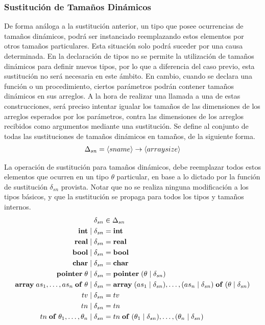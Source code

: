 \subsubsection{Sustitución de Tamaños Dinámicos}

De forma análoga a la sustitución anterior, un tipo que posee ocurrencias de tamaños dinámicos, podrá ser instanciado reemplazando estos elementos por otros tamaños particulares.
Esta situación solo podrá suceder por una causa determinada.
En la declaración de tipos no se permite la utilización de tamaños dinámicos para definir nuevos tipos, por lo que a diferencia del caso previo, esta sustitución no será necesaria en este ámbito.
En cambio, cuando se declara una función o un procedimiento, ciertos parámetros podrán contener tamaños dinámicos en sus arreglos.
A la hora de realizar una llamada a una de estas construcciones, será preciso intentar igualar los tamaños de las dimensiones de los arreglos esperados por los parámetros, contra las dimensiones de los arreglos recibidos como argumentos mediante una sustitución.
Se define al conjunto de todas las sustituciones de tamaños dinámicos en tamaños, de la siguiente forma.
\begin{gather*}
\Delta_{sn} = \langle sname \rangle \rightarrow \langle arraysize \rangle
\end{gather*}

La operación de sustitución para tamaños dinámicos, debe reemplazar todos estos elementos que ocurren en un tipo $\theta$ particular, en base a lo dictado por la función de sustitución $\delta_{sn}$ provista.
Notar que no se realiza ninguna modificación a los tipos básicos, y que la sustitución se propaga para todos los tipos y tamaños internos.
\begin{align*}
\delta_{sn}
&\in
\Delta_{sn}
\\
\mathbf{int} \mid \delta_{sn}
&=
\mathbf{int}
\\
\mathbf{real} \mid \delta_{sn}
&=
\mathbf{real}
\\
\mathbf{bool} \mid \delta_{sn}
&=
\mathbf{bool}
\\
\mathbf{char} \mid \delta_{sn}
&=
\mathbf{char}
\\
\mathbf{pointer} \; \theta \mid \delta_{sn}
&=
\mathbf{pointer} \; (\theta \mid \delta_{sn})
\\
\mathbf{array} \; as_1, \ldots, as_n \; \mathbf{of} \; \theta \mid \delta_{sn}
&=
\mathbf{array} \; (as_1 \mid \delta_{sn}), \ldots, (as_n \mid \delta_{sn}) \; \mathbf{of} \; (\theta \mid \delta_{sn})
\\
tv \mid \delta_{sn}
&=
tv
\\
tn \mid \delta_{sn}
&=
tn
\\
tn \; \mathbf{of} \; \theta_1, \ldots, \theta_n \mid \delta_{sn}
&=
tn \; \mathbf{of} \; (\theta_1 \mid \delta_{sn}), \ldots, (\theta_n \mid \delta_{sn})
\end{align*}

